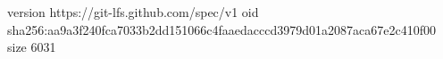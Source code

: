 version https://git-lfs.github.com/spec/v1
oid sha256:aa9a3f240fca7033b2dd151066c4faaedacccd3979d01a2087aca67e2c410f00
size 6031
